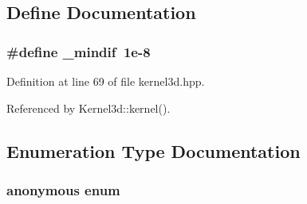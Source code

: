 \subsection{Define Documentation}
\subsubsection{\setlength{\rightskip}{0pt plus 5cm}\#define \_\-mindif~1e-8}\label{kernel3d_8hpp_318abafeb7df979cf115fabc3bd24b53_318abafeb7df979cf115fabc3bd24b53}




Definition at line 69 of file kernel3d.hpp.

Referenced by Kernel3d::kernel().

\subsection{Enumeration Type Documentation}
\subsubsection{\setlength{\rightskip}{0pt plus 5cm}anonymous enum}\label{kernel3d_8hpp_dca29a1140aadadfd92b34a02fa516ef_dca29a1140aadadfd92b34a02fa516ef}


